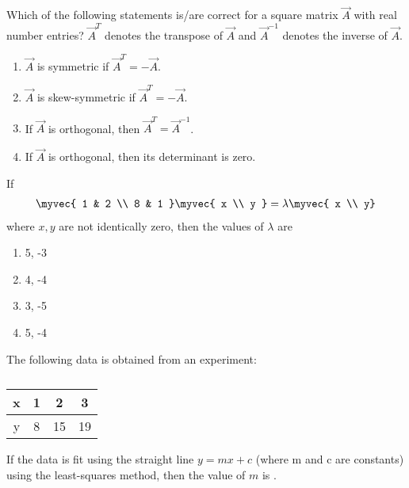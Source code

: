 \item Which of the following statements is/are correct for a square matrix $\vec{A}$ with real number entries? $\vec{A}^T$ denotes the transpose of $\vec{A}$ and $\vec{A}^{-1}$ denotes the inverse of $\vec{A}$.   \hfill{}
\begin{enumerate}
\item $\vec{A}$ is symmetric if $\vec{A}^T = -\vec{A}$.
\item $\vec{A}$ is skew-symmetric if $\vec{A}^T = -\vec{A}$.
\item If $\vec{A}$ is orthogonal, then $\vec{A}^T = \vec{A}^{-1}$.
\item If $\vec{A}$ is orthogonal, then its determinant is zero.
\end{enumerate}
\item If
\begin{align*}
\myvec{ 1 & 2 \\ 8 & 1 } \myvec{ x \\ y } = \lambda\myvec{ x \\ y}
\end{align*}
where $x, y$ are not identically zero, then the values of $\lambda$ are \hfill{}
\begin{multicols}{4}
\begin{enumerate}
\item 5, -3
\item 4, -4
\item 3, -5
\item 5, -4
\end{enumerate}
\end{multicols}
\item The following data is obtained from an experiment:
	\begin{table}[H]
\begin{center}
\begin{tabular}{|c|c|c|c|}
\hline
x & 1 & 2 & 3 \\ \hline
y & 8 & 15 & 19\\
\hline
\end{tabular}
\end{center}
\caption{}
\label{tab:gate/2024/MT}
\end{table}
If the data is fit using the straight line $y=mx+c$ (where m and c are constants) using the least-squares method, then the value of $m$ is \underline{\hspace{1cm}}. \hfill{}
